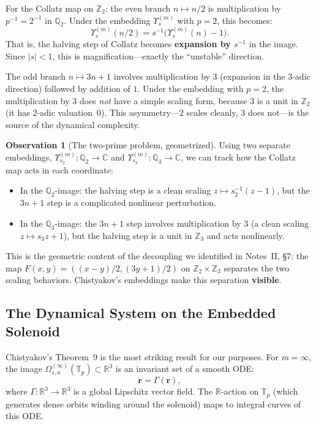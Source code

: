 \documentclass[11pt,a4paper]{article}
\newcommand{\Z}{\mathbb{Z}}
\newcommand{\R}{\mathbb{R}}
\newcommand{\C}{\mathbb{C}}
\newcommand{\Q}{\mathbb{Q}}
\newcommand{\T}{\mathbb{T}}
\theoremstyle{plain}
\theoremstyle{definition}
\newtheorem{observation}[theorem]{Observation}
\begin{document}
For the Collatz map on $\Z_2$: the even branch $n \mapsto n/2$ is multiplication by $p^{-1} = 2^{-1}$ in $\Q_2$. Under the embedding $\Upsilon_s^{(m)}$ with $p = 2$, this becomes:
\begin{equation}
    \Upsilon_s^{(m)}(n/2) = s^{-1}\bigl(\Upsilon_s^{(m)}(n) - 1\bigr).
\end{equation}
That is, the halving step of Collatz becomes \textbf{expansion by $s^{-1}$} in the image. Since $|s| < 1$, this is magnification---exactly the ``unstable'' direction.

The odd branch $n \mapsto 3n + 1$ involves multiplication by $3$ (expansion in the $3$-adic direction) followed by addition of $1$. Under the embedding with $p = 2$, the multiplication by $3$ does \emph{not} have a simple scaling form, because $3$ is a unit in $\Z_2$ (it has $2$-adic valuation~$0$). This asymmetry---$2$ scales cleanly, $3$ does not---is the source of the dynamical complexity.

\begin{observation}[The two-prime problem, geometrized]
    Using two separate embeddings, $\Upsilon_{s_2}^{(m)}: \Q_2 \to \C$ and $\Upsilon_{s_3}^{(m)}: \Q_3 \to \C$, we can track how the Collatz map acts in each coordinate:
    \begin{itemize}
        \item In the $\Q_2$-image: the halving step is a clean scaling $z \mapsto s_2^{-1}(z - 1)$, but the $3n+1$ step is a complicated nonlinear perturbation.
        \item In the $\Q_3$-image: the $3n+1$ step involves multiplication by $3$ (a clean scaling $z \mapsto s_3 z + 1$), but the halving step is a unit in $\Z_3$ and acts nonlinearly.
    \end{itemize}
    This is the geometric content of the decoupling we identified in Notes~II, \S7: the map $F(x,y) = ((x-y)/2, (3y+1)/2)$ on $\Z_2 \times \Z_3$ separates the two scaling behaviors. Chistyakov's embeddings make this separation \textbf{visible}.
\end{observation}


\subsection{The Dynamical System on the Embedded Solenoid}\label{sec:dynsys}

Chistyakov's Theorem~9 is the most striking result for our purposes. For $m = \infty$, the image $\Omega_{s,a}^{(\infty)}(\T_p) \subset \R^3$ is an invariant set of a smooth ODE:
\begin{equation}\label{eq:Gamma}
    \dot{\mathbf{r}} = \Gamma(\mathbf{r}),
\end{equation}
where $\Gamma: \R^3 \to \R^3$ is a global Lipschitz vector field. The $\R$-action on $\T_p$ (which generates dense orbits winding around the solenoid) maps to integral curves of this ODE.
\end{document}
